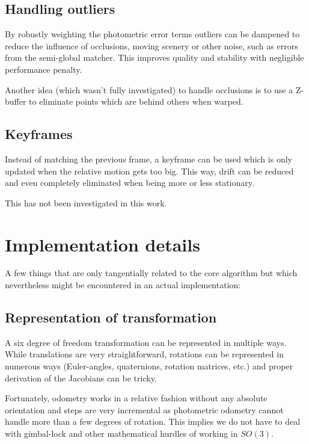 \subsection{Handling outliers}

By robustly weighting the photometric error terms outliers can be dampened to
reduce the influence of occlusions, moving scenery or other noise, such as
errors from the semi-global matcher. This improves quality and stability with
negligible performance penalty.

Another idea (which wasn't fully investigated) to handle occlusions is to use a
Z-buffer to eliminate points which are behind others when warped.

\subsection{Keyframes}

Instead of matching the previous frame, a keyframe can be used which is only
updated when the relative motion gets too big. This way, drift can be reduced
and even completely eliminated when being more or less stationary.

This has not been investigated in this work.




\section{Implementation details}

A few things that are only tangentially related to the core algorithm but which
nevertheless might be encountered in an actual implementation:

\subsection{Representation of transformation}

A six degree of freedom transformation can be represented in multiple ways.
While translations are very straightforward, rotations can be represented in
numerous ways (Euler-angles, quaternions, rotation matrices, etc.) and proper
derivation of the Jacobians can be tricky.

Fortunately, odometry works in a relative fashion without any absolute
orientation and steps are very incremental as photometric odometry cannot
handle more than a few degrees of rotation. This implies we do not have to deal
with gimbal-lock and other mathematical hurdles of working in $SO(3)$.

